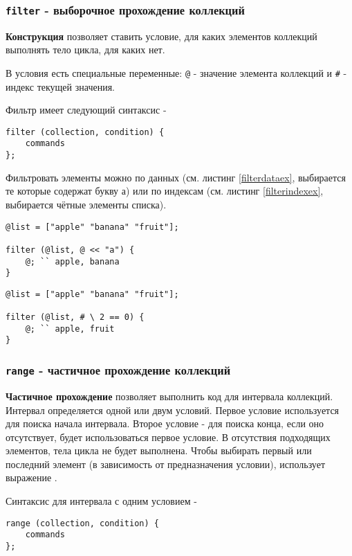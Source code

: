 \documentclass[a4paper, 14pt]{extarticle}
\begin{document}
\subsubsection{\lstinline`filter` - выборочное прохождение коллекций}

{\bf Конструкция } позволяет ставить условие, для каких элементов коллекций выполнять тело цикла, для каких нет.

В условия есть специальные переменные: \lstinline|@| - значение элемента коллекций и \lstinline|#| - индекс текущей значения.

Фильтр имеет следующий синтаксис -
\begin{lstlisting}[numbers=none]
filter (collection, condition) {
	commands
};
\end{lstlisting}

Фильтровать элементы можно по данных (см. листинг \ref{filterdataex}, выбирается те которые содержат букву а) или по индексам (см. листинг \ref{filterindexex}, выбирается чётные элементы списка).

\begin{lstlisting}[caption=Фильтрование по данных, label=filterdataex]
@list = ["apple" "banana" "fruit"];

filter (@list, @ << "a") {
	@; `` apple, banana
}
\end{lstlisting}

\begin{lstlisting}[caption=Фильтрование по индексов, label=filterindexex]
@list = ["apple" "banana" "fruit"];

filter (@list, # \ 2 == 0) {
	@; `` apple, fruit
}
\end{lstlisting}

\subsubsection{\lstinline`range` - частичное прохождение коллекций}

{\bf Частичное прохождение} позволяет выполнить код для интервала коллекций. Интервал определяется одной или двум условий. Первое условие используется для поиска начала интервала. Второе условие - для поиска конца, если оно отсутствует, будет использоваться первое условие. В отсутствия подходящих элементов, тела цикла не будет выполнена. Чтобы выбирать первый или последний элемент (в зависимость от предназначения условии), использует выражение \true{}.

Синтаксис для интервала с одним условием -
\begin{lstlisting}[numbers=none]
range (collection, condition) {
	commands
};
\end{lstlisting}
\end{document}
